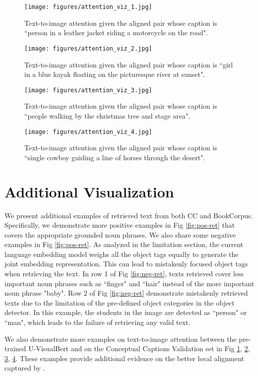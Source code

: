 \begin{figure}[h!]
\centering
\texttt{[image: figures/attention\_viz\_1.jpg]}
\vspace{-0.2cm}
\caption{Text-to-image attention given the aligned pair whose caption is ``person in a leather jacket riding a motorcycle on the road".}
\label{fig:attn_viz_1}
\end{figure}

\begin{figure}[h!]
\centering
\texttt{[image: figures/attention\_viz\_2.jpg]}
\vspace{-0.2cm}
\caption{Text-to-image attention given the aligned pair whose caption is ``girl in a blue kayak floating on the picturesque river at sunset".}
\label{fig:attn_viz_2}
\end{figure}

\begin{figure}[h!]
\centering
\texttt{[image: figures/attention\_viz\_3.jpg]}
\vspace{-0.2cm}
\caption{Text-to-image attention given the aligned pair whose caption is ``people walking by the christmas tree and stage area".}
\label{fig:attn_viz_3}
\end{figure}

\begin{figure}[h!]
\centering
\texttt{[image: figures/attention\_viz\_4.jpg]}
\vspace{-0.2cm}
\caption{Text-to-image attention given the aligned pair whose caption is ``single cowboy guiding a line of horses through the desert".}
\label{fig:attn_viz_4}
\end{figure}
\section{Additional Visualization}
We present additional examples of retrieved text from both CC and BookCorpus. Specifically, we demonstrate more positive examples in Fig \ref{fig:pos-ret} that covers the appropriate grounded noun phrases. We also share some negative examples in Fig \ref{fig:pos-ret}. As analyzed in the limitation section, the current language embedding model weighs all the object tags equally to generate the joint embedding representation. This can lead to mistakenly focused object tags when retrieving the text. In row 1 of Fig \ref{fig:neg-ret}, texts retrieved cover less important noun phrases such as ``finger" and ``hair" instead of the more important noun phrase "baby". Row 2 of Fig \ref{fig:neg-ret} demonstrate mistakenly retrieved texts due to the limitation of the pre-defined object categories in the object detector. In this example,  the students in the image are detected as ``person" or ``man", which leads to the failure of retrieving any valid text.    

We also demonstrate more examples on text-to-image attention between the pre-trained U-VisualBert and {\ModelName } on the Conceptual Captions Validation set in Fig \ref{fig:attn_viz_1}, \ref{fig:attn_viz_2}, \ref{fig:attn_viz_3}, \ref{fig:attn_viz_4}. These examples provide additional evidence on the better local alignment captured by \ModelName. 